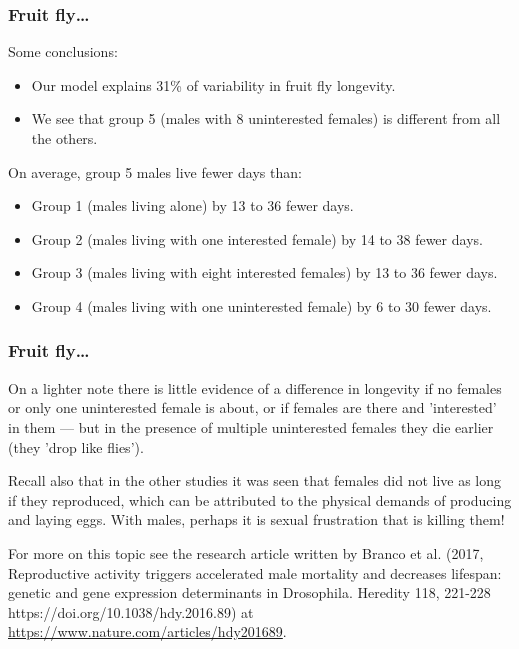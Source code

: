 \documentclass{beamer}\usepackage[]{graphicx}\usepackage[]{xcolor}
\begin{document}
\begin{frame}[fragile]
\frametitle{Fruit fly\ldots}

Some conclusions:
\begin{itemize}
  \item Our model explains 31\% of variability in fruit fly longevity.

  \item We see that group 5 (males with 8 uninterested females) is different from all the others. 

\end{itemize}

On average, group 5 males live fewer days than:

\begin{itemize}

\item Group 1 (males living alone) by 13 to 36 fewer days.

\item Group 2 (males living with one interested female) by 14 to 38 fewer days.

\item Group 3 (males living with eight interested females) by 13 to 36 fewer days.

\item Group 4 (males living with one uninterested female) by 6 to 30 fewer days.
\end{itemize}

\end{frame}


\begin{frame}[fragile]
\frametitle{Fruit fly\ldots}

On a lighter note there is little evidence of a difference in longevity
if no females or only one uninterested female is about,
or if females are there and 'interested' in them ---
but in the presence of multiple uninterested females they die earlier
(they 'drop like flies').

\medskip

Recall also that in the other studies it was seen that females did not live as long if
they reproduced, which can be attributed to the physical demands of producing and laying eggs. With males, perhaps it is sexual frustration that is killing them!

\medskip

For more on this topic see the research article written by Branco et al. (2017, Reproductive activity triggers accelerated male mortality and decreases lifespan: genetic and gene expression determinants in Drosophila. Heredity 118, 221-228 https://doi.org/10.1038/hdy.2016.89) at
\url{https://www.nature.com/articles/hdy201689}.
\end{frame}
\end{document}
